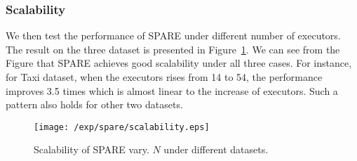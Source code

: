 \subsubsection{Scalability}
We then test the performance of SPARE under different number of executors. The result on the three dataset is presented in Figure~\ref{exp:scalability}. We can see from the Figure that SPARE achieves good scalability under all three cases. For instance, for Taxi dataset, when the executors rises from 14 to 54, the performance improves 3.5 times which is almost linear to the increase of executors. Such a pattern also holds for other two datasets.

\begin{figure}[h]
\centering
   \texttt{[image: /exp/spare/scalability.eps]}
\caption{Scalability of SPARE vary. $N$ under different datasets.}
\label{exp:scalability}
\end{figure}



